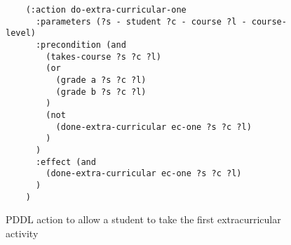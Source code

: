 \begin{figure}[t]
    \begin{lstlisting}
    (:action do-extra-curricular-one
      :parameters (?s - student ?c - course ?l - course-level)
      :precondition (and 
        (takes-course ?s ?c ?l)
        (or
          (grade a ?s ?c ?l)
          (grade b ?s ?c ?l)
        )
        (not
          (done-extra-curricular ec-one ?s ?c ?l)
        )
      )
      :effect (and 
        (done-extra-curricular ec-one ?s ?c ?l)
      )
    )
    \end{lstlisting}
    \caption{PDDL action to allow a student to take the first extracurricular activity}\label{fig:extra-curricular-one}
\end{figure}